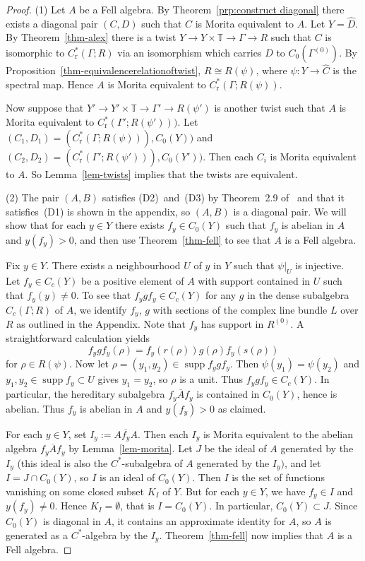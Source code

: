 \documentclass[12pt,a4paper]{amsart}
\newcommand{\field}[1]{\mathbb{#1}}
\newcommand{\TT}{\field{T}}
\newcommand{\supp}{\operatorname{supp}}
\newcommand{\red}{\operatorname{r}}
\newcommand{\tgcsa}[2]{\ensuremath{C^*_{\red}(#1 ; #2)}}
\begin{document}
\begin{proof}
(1) Let $A$ be a Fell algebra.  By Theorem~\ref{prp:construct
diagonal} there exists a diagonal pair $(C,D)$ such that $C$ is
Morita equivalent to $A$. Let $Y = \widehat{D}$. By
Theorem~\ref{thm-alex} there is a twist $Y\to
Y\times\TT\to\Gamma\to R$  such that $C$ is isomorphic to
\tgcsa{\Gamma}{R} via an isomorphism which carries $D$ to
$C_0(\Gamma^{(0)})$. By
Proposition~\ref{thm-equivalencerelationoftwist}, $R \cong
R(\psi)$, where $\psi:Y\to \widehat C$ is the spectral map.
Hence $A$ is Morita equivalent to \tgcsa{\Gamma}{R(\psi)}.

Now suppose that $Y'\to Y'\times\TT\to\Gamma'\to R(\psi')$ is
another twist such that $A$ is Morita equivalent to
$\tgcsa{\Gamma'}{R(\psi')})$. Let $(C_1, D_1) =
(\tgcsa{\Gamma}{R(\psi)}), C_0(Y))$ and $(C_2, D_2) =
(\tgcsa{\Gamma'}{R(\psi')}), C_0(Y'))$. Then each $C_i$ is
Morita equivalent to $A$. So Lemma~\ref{lem-twists} implies that
the twists are equivalent.

(2)  The pair $(A, B)$  satisfies (D2)~and~(D3) by Theorem~2.9
of~\cite{Kumjian1986} and that it satisfies~(D1) is shown in the
appendix, so $(A,B)$ is a diagonal pair.  We will show that for
each $y \in Y$ there exists $f_y \in C_0(Y)$ such that $f_y$ is
abelian in $A$ and $y(f_y) > 0$,  and then use
Theorem~\ref{thm-fell} to see that $A$ is a Fell algebra.

Fix $y\in Y$. There exists a neighbourhood $U$ of $y$ in $Y$
such that $\psi|_U$ is injective. Let $f_y\in C_c(Y)$ be a
positive element of $A$ with support contained in $U$ such that
$f_y(y)\neq 0$. To see that $f_ygf_y \in C_c(Y)$ for any $g$
in the dense subalgebra  $C_c(\Gamma;R)$ of $A$, we identify
$f_y$, $g$ with sections of the complex line bundle $L$ over
$R$ as outlined in the Appendix. Note that ${f_y}$ has support
in $R^{(0)}$. A straightforward calculation yields
\[
    {f_ygf_y}(\rho)={f_y}(r(\rho))g(\rho){f_y}(s(\rho))
\]
for $\rho\in R(\psi)$. Now let $\rho=(y_1,y_2)\in \supp
f_ygf_y$. Then $\psi(y_1)=\psi(y_2)$ and
$y_1,y_2\in\supp f_y\subset U$ gives $y_1=y_2$, so $\rho$
is a unit.  Thus $f_ygf_y \in C_c(Y)$.  In particular, the
hereditary subalgebra $\overline{f_yAf_y}$ is contained in
$C_0(Y)$, hence is abelian.  Thus $f_y$ is abelian in $A$ and
$y(f_y) > 0$ as claimed.

For each $y \in Y$, set $I_y := \overline{A f_y A}$. Then each
$I_y$ is Morita equivalent to the abelian algebra
$\overline{f_y A f_y}$ by Lemma~\ref{lem-morita}. Let $J$ be
the ideal of $A$ generated by the $I_y$ (this ideal is also the
$C^*$-subalgebra of $A$ generated by the $I_y)$, and let $I = J
\cap C_0(Y)$, so $I$ is an ideal of $C_0(Y)$. Then $I$ is the
set of functions vanishing on some closed subset $K_I$ of $Y$.
But for each $y \in Y$, we have $f_y \in I$ and $y(f_y)\neq 0$.
Hence $K_I = \emptyset$, that is $I = C_0(Y)$.  In particular,
$C_0(Y)\subset J$. Since $C_0(Y)$ is diagonal in $A$, it
contains an approximate identity for $A$, so $A$ is generated
as a $C^*$-algebra by the $I_y$. Theorem~\ref{thm-fell} now
implies that $A$ is a Fell algebra.


\end{proof}
\end{document}

